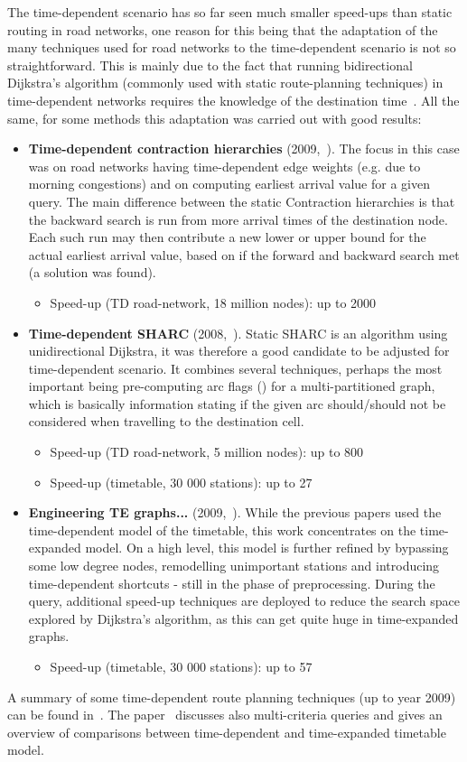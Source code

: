 	The time-dependent scenario has so far seen much smaller speed-ups than static routing in road networks, one reason for this being that the adaptation of the many techniques used for road networks to the time-dependent scenario is not so straightforward. This is mainly due to the fact that running bidirectional Dijkstra's algorithm (commonly used with static route-planning techniques) in time-dependent networks requires the knowledge of the destination time~\cite{engtimeexp09}. All the same, for some methods this adaptation was carried out with good results:
	\begin{itemize}
		\item \textbf{Time-dependent contraction hierarchies} (2009,~\cite{timedepch09}). The focus in this case was on road networks having time-dependent edge weights (e.g. due to morning congestions) and on computing earliest arrival value for a given query. The main difference between the static Contraction hierarchies is that the backward search is run from more arrival times of the destination node. Each such run may then contribute a new lower or upper bound for the actual earliest arrival value, based on if the forward and backward search met (a solution was found).
		\begin{itemize}
			\item Speed-up (TD road-network, 18 million nodes): up to 2000
		\end{itemize}
		\item \textbf{Time-dependent SHARC} (2008,~\cite{sharc08}). Static SHARC is an algorithm using unidirectional Dijkstra, it was therefore a good candidate to be adjusted for time-dependent scenario. It combines several techniques, perhaps the most important being pre-computing arc flags (\cite{arcflags06}) for a multi-partitioned graph, which is basically information stating if the given arc should/should not be considered when travelling to the destination cell.
		\begin{itemize}
			\item Speed-up (TD road-network, 5 million nodes): up to 800
			\item Speed-up (timetable, 30 000 stations): up to 27
		\end{itemize}
		\item \textbf{Engineering TE graphs...} (2009,~\cite{engtimeexp09}). While the previous papers used the time-dependent model of the timetable, this work concentrates on the time-expanded model. On a high level, this model is further refined by bypassing some low degree nodes, remodelling unimportant stations and introducing time-dependent shortcuts - still in the phase of preprocessing. During the query, additional speed-up techniques are deployed to reduce the search space explored by Dijkstra's algorithm, as this can get quite huge in time-expanded graphs.
		\begin{itemize}
			\item Speed-up (timetable, 30 000 stations): up to 57
		\end{itemize}
	\end{itemize}
	\hspace{\fill}
	
	\noindent A summary of some time-dependent route planning techniques (up to year 2009) can be found in~\cite{tdroute09}. The paper~\cite{timetablemodelsalgs07} discusses also multi-criteria queries and gives an overview of comparisons between time-dependent and time-expanded timetable model. 